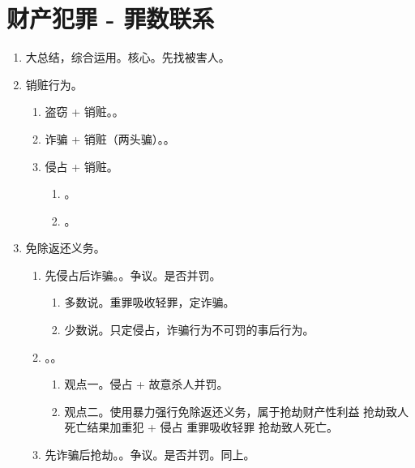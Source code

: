\section{财产犯罪 - 罪数联系}
\begin{enumerate}
  \item 大总结，综合运用。核心。先找被害人。
  \item 销赃行为。
        \begin{enumerate}
          \item 盗窃 + 销赃。。
          \item 诈骗 + 销赃（两头骗）。。
          \item 侵占 + 销赃。
                \begin{enumerate}
                  \item {}。
                  \item {}。
                \end{enumerate}
        \end{enumerate}
  \item 免除返还义务。
        \begin{enumerate}
          \item 先侵占后诈骗。。争议。是否并罚。
                \begin{enumerate}
                  \item 多数说。重罪吸收轻罪，定诈骗。
                  \item 少数说。只定侵占，诈骗行为不可罚的事后行为。
                \end{enumerate}
          \item {}。。
                \begin{enumerate}
                  \item 观点一。侵占 + 故意杀人并罚。
                  \item 观点二。使用暴力强行免除返还义务，属于抢劫财产性利益 \yjt 抢劫致人死亡结果加重犯 + 侵占 \yjt 重罪吸收轻罪 \yjt 抢劫致人死亡。
                \end{enumerate}
          \item 先诈骗后抢劫。。争议。是否并罚。同上。

\end{enumerate}
\end{enumerate}
